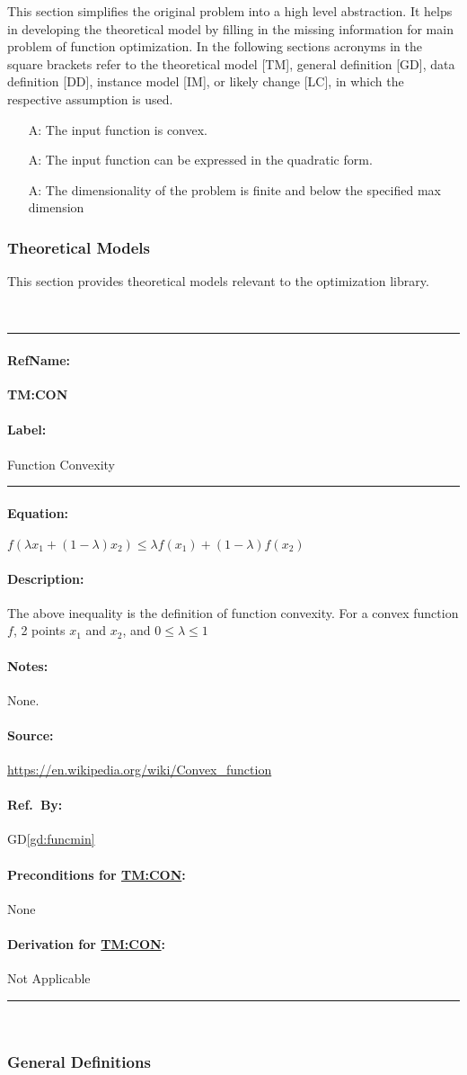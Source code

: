 \documentclass[12pt]{article}
\newcounter{assumpnum} %
\newcommand{\deftheory}[9][Not Applicable]
{
\newpage
\noindent \rule{\textwidth}{0.5mm}

\paragraph{RefName: } \textbf{#2} \phantomsection 
\label{#2}

\paragraph{Label:} #3

\noindent \rule{\textwidth}{0.5mm}

\paragraph{Equation:}

#4

\paragraph{Description:}

#5

\paragraph{Notes:}

#6

\paragraph{Source:}

#7

\paragraph{Ref.\ By:}

#8

\paragraph{Preconditions for \hyperref[#2]{#2}:}
\label{#2_precond}

#9

\paragraph{Derivation for \hyperref[#2]{#2}:}
\label{#2_deriv}

#1

\noindent \rule{\textwidth}{0.5mm}

}
\begin{document}
This section simplifies the original problem into a high level abstraction.
It helps in developing the theoretical model by filling in the missing information for main problem of function optimization.
In the following sections acronyms in the square brackets refer to the theoretical model [TM],
general definition [GD], data definition [DD], instance model [IM], or likely
change [LC], in which the respective assumption is used.

\begin{itemize}

\item[A\refstepcounter{assumpnum}\theassumpnum \label{assumption:convexity}:]
  The input function is convex.
\item[A\refstepcounter{assumpnum}\theassumpnum \label{assumption:quadratic}:]
  The input function can be expressed in the quadratic form.
\item[A\refstepcounter{assumpnum}\theassumpnum \label{assumption:maxdim}:]
  The dimensionality of the problem is finite and below the specified max dimension

\end{itemize}

\subsubsection{Theoretical Models}\label{sec_theoretical}
This section provides theoretical models relevant to the optimization library.


~\newline

\noindent
\deftheory
{TM:CON}
{Function Convexity}
{
  $f(\lambda x_{1} + (1 - \lambda) x_{2}) \leq \lambda f(x_1) + (1-\lambda)f(x_2)$
}
{
  The above inequality is the definition of function convexity. For a convex function $f$, 2 points $x_1$ and $x_2$, and $0 \leq \lambda \leq 1$
}
{
None.
}
{
  \url{https://en.wikipedia.org/wiki/Convex_function}
}
{
  GD\ref{gd:funcmin}
}
{
None
}
{}



~\newline

\subsubsection{General Definitions}\label{sec:gd}
\end{document}
